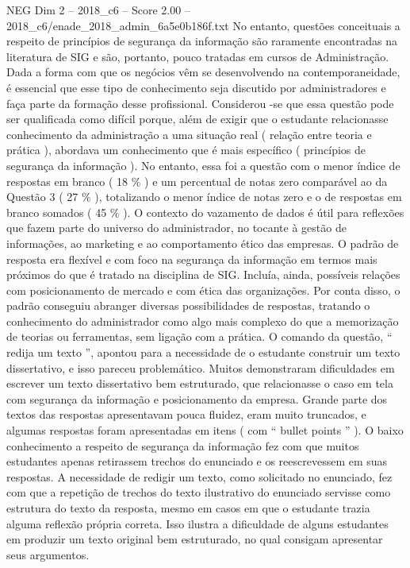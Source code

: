\begin{textsample}{NEG Dim 2 – 2018\_c6 – Score 2.00 – 2018\_c6/enade\_2018\_admin\_6a5e0b186f.txt}
No entanto, questões conceituais a respeito de princípios de segurança da informação são raramente encontradas na literatura de SIG e são, portanto, pouco tratadas em cursos de Administração.
Dada a forma com que os negócios vêm se desenvolvendo na contemporaneidade, é essencial que esse tipo de conhecimento seja discutido por administradores e faça parte da formação desse profissional.
Considerou -se que essa questão pode ser qualificada como difícil porque, além de exigir que o estudante relacionasse conhecimento da administração a uma situação real ( relação entre teoria e prática ), abordava um conhecimento que é mais específico ( princípios de segurança da informação ).
No entanto, essa foi a questão com o menor índice de respostas em branco ( 18 \% ) e um percentual de notas zero comparável ao da Questão 3 ( 27 \% ), totalizando o menor índice de notas zero e o de respostas em branco somados ( 45 \% ).
O contexto do vazamento de dados é útil para reflexões que fazem parte do universo do administrador, no tocante à gestão de informações, ao marketing e ao comportamento ético das empresas.
O padrão de resposta era flexível e com foco na segurança da informação em termos mais próximos do que é tratado na disciplina de SIG.
Incluía, ainda, possíveis relações com posicionamento de mercado e com ética das organizações.
Por conta disso, o padrão conseguiu abranger diversas possibilidades de respostas, tratando o conhecimento do administrador como algo mais complexo do que a memorização de teorias ou ferramentas, sem ligação com a prática.
O comando da questão, “ redija um texto ”, apontou para a necessidade de o estudante construir um texto dissertativo, e isso pareceu problemático.
Muitos demonstraram dificuldades em escrever um texto dissertativo bem estruturado, que relacionasse o caso em tela com segurança da informação e posicionamento da empresa.
Grande parte dos textos das respostas apresentavam pouca fluidez, eram muito truncados, e algumas respostas foram apresentadas em itens ( com “ bullet points ” ).
O baixo conhecimento a respeito de segurança da informação fez com que muitos estudantes apenas retirassem trechos do enunciado e os reescrevessem em suas respostas.
A necessidade de redigir um texto, como solicitado no enunciado, fez com que a repetição de trechos do texto ilustrativo do enunciado servisse como estrutura do texto da resposta, mesmo em casos em que o estudante trazia alguma reflexão própria correta.
Isso ilustra a dificuldade de alguns estudantes em produzir um texto original bem estruturado, no qual consigam apresentar seus argumentos.

\end{textsample}
